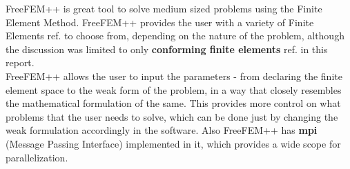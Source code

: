 
FreeFEM++ is great tool to solve medium sized problems using the Finite Element Method. FreeFEM++ provides the user with a variety of Finite Elements ref.\cite{1205.1293} to choose from, depending on the nature of the problem, although the discussion was limited to only \textbf{conforming finite elements} ref.\cite{FEM} in this report. \\

\noindent
FreeFEM++ allows the user to input the parameters - from declaring the finite element space to the weak form of the problem, in a way that closely resembles the mathematical formulation of the same. This provides more control on what problems that the user needs to solve, which can be done just by changing the weak formulation accordingly in the software. Also FreeFEM++ has \textbf{mpi} (Message Passing Interface) implemented in it, which provides a wide scope for parallelization.\\


